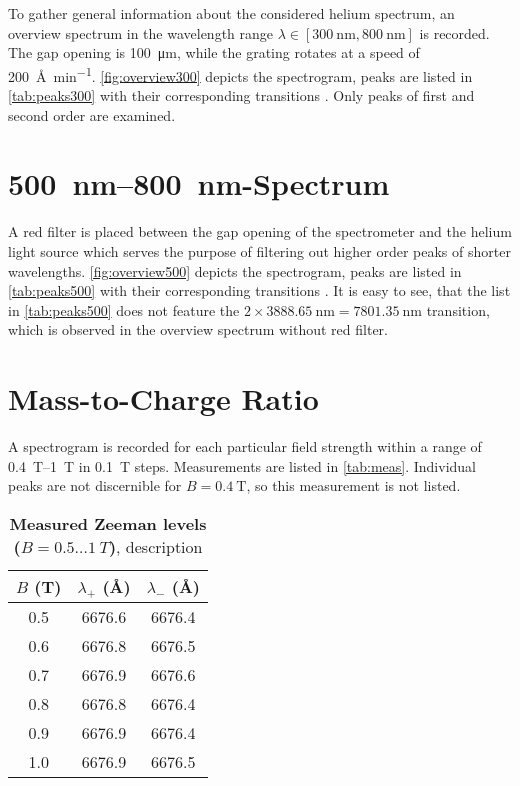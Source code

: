 To gather general information about the considered helium spectrum, an overview spectrum in the wavelength range $\lambda\in [\SI{300}{\nm}, \SI{800}{\nm}]$ is recorded.
The gap opening is \SI{100}{\um}, while the grating rotates at a speed of \SI{200}{\angstrom\per\minute}.
\autoref{fig:overview300} depicts the spectrogram, peaks are listed in \autoref{tab:peaks300} with their corresponding transitions \cite{hetrans}.
Only peaks of first and second order are examined.

\section{\SIrange{500}{800}{\nm}-Spectrum}\label{sec:500800nm}
A red filter is placed between the gap opening of the spectrometer and the helium light source which serves the purpose of filtering out higher order peaks of shorter wavelengths.
\autoref{fig:overview500} depicts the spectrogram, peaks are listed in \autoref{tab:peaks500} with their corresponding transitions \cite{hetrans}.
It is easy to see, that the list in \autoref{tab:peaks500} does not feature the $2\times\SI{3888.65}{\nm} = \SI{7801.35}{\nm}$ transition, which is observed in the overview spectrum without red filter.


\section{Mass-to-Charge Ratio}
A spectrogram is recorded for each particular field strength within a range of \SIrange{0.4}{1}{\tesla} in \SI{0.1}{\tesla} steps.
Measurements are listed in \autoref{tab:meas}.
Individual peaks are not discernible for $B = \SI{0.4}{\tesla}$, so this measurement is not listed.

\begin{table}[tbp]
	\centering
	\caption[Measured Zeeman levels ($B = \num{0.5} \dots \SI{1}{T}$)]{\textbf{Measured Zeeman levels ($B = \num{0.5} \dots \SI{1}{T}$)}, description}
	\label{tab:meas}
	\begin{tabular}{SSS}
		\toprule
		{$B$ (\si{\tesla})}& {$\lambda_+$ (\si{\angstrom})}& {$\lambda_-$ (\si{\angstrom})}\\
		&	6676.6&	6676.4\\
		0.6&	6676.8&	6676.5\\
		0.7&	6676.9&	6676.6\\
		0.8&	6676.8&	6676.4\\
		0.9&	6676.9&	6676.4\\
		1.0&	6676.9&	6676.5\\
		\bottomrule
	\end{tabular}
\end{table}

